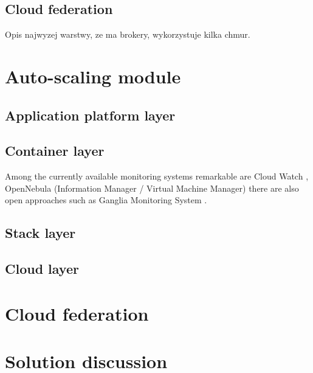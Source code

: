 \subsection{Cloud federation}
Opis najwyzej warstwy, ze ma brokery, wykorzystuje kilka chmur.


\section{Auto-scaling module}

\subsection{Application platform layer}

\subsection{Container layer}
Among the currently available monitoring systems remarkable are Cloud Watch \cite{CloudWatch}, OpenNebula (Information Manager / Virtual Machine Manager) \cite{OpenNebula} there are also open approaches such as Ganglia Monitoring System \cite{MaChCu04}.

\subsection{Stack layer}

\subsection{Cloud layer}


\section{Cloud federation}

\section{Solution discussion}

